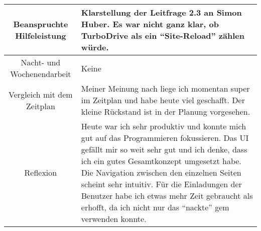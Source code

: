 \begin{tabularx}{\textwidth}[H]{|c|X|}
    Beanspruchte Hilfeleistung &
    Klarstellung der Leitfrage 2.3 an Simon Huber. Es war nicht ganz klar, ob TurboDrive als ein \enquote{Site-Reload} zählen würde.
    \\ \hline

    Nacht- und Wochenendarbeit &
    Keine
    \\ \hline

    Vergleich mit dem Zeitplan &
    Meiner Meinung nach liege ich momentan super im Zeitplan und habe heute viel geschafft. Der kleine Rückstand ist in der Planung vorgesehen.
    \\ \hline

    Reflexion                  &
    Heute war ich sehr produktiv und konnte mich gut auf das Programmieren fokussieren. Das UI gefällt mir so weit sehr gut
    und ich denke, dass ich ein gutes Gesamtkonzept umgesetzt habe. Die Navigation zwischen den einzelnen Seiten scheint sehr intuitiv.
    Für die Einladungen der Benutzer habe ich etwas mehr Zeit gebraucht als erhofft, da ich nicht nur das \enquote{nackte} gem verwenden konnte.
    \\ \hline
\end{tabularx}
